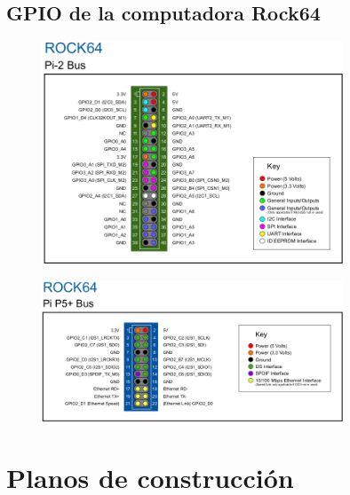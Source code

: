 \documentclass[12pt, letterpaper, oneside]{book}
\begin{document}
	\section{GPIO de la computadora Rock64}
	\label{sec:pi}
	\begin{figure}[htbp!]
		\centering
		\includegraphics[width=0.8\textwidth]{./Figuras/Pi-2}
	\end{figure}
	\begin{figure}[htbp!]
		\centering
		\includegraphics[width=0.8\textwidth]{./Figuras/Pi-5}
	\end{figure}
	\chapter{Planos de construcción}
	\label{chap:plan}
	\vspace*{-0.5cm}
\end{document}
